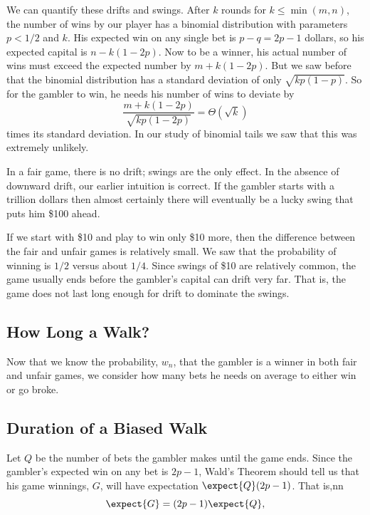 \begin{editingnotes}

We can quantify these drifts and swings.  After $k$ rounds for $k \le
\min(m,n)$, the number of wins by our player has a binomial distribution
with parameters $p < 1/2$ and $k$.  His expected win on any single bet is
$p-q = 2p-1$ dollars, so his expected capital is $n-k(1-2p)$.  Now to be a
winner, his actual number of wins must exceed the expected number by
$m+k(1-2p)$.  But we saw before that the binomial distribution has a
standard deviation of only $\sqrt{kp(1-p)}$.  So for the gambler to win,
he needs his number of wins to deviate by
\[
\frac{m+k(1-2p)}{\sqrt{kp(1-2p)}}=\Theta(\sqrt{k})
\]
times its standard deviation.  In our study of binomial tails we saw that
this was extremely unlikely.

In a fair game, there is no drift; swings are the only effect.  In the
absence of downward drift, our earlier intuition is correct.  If the
gambler starts with a trillion dollars then almost certainly there
will eventually be a lucky swing that puts him \$100 ahead.

If we start with \$10 and play to win only \$10 more, then the difference
between the fair and unfair games is relatively small. We saw that the
probability of winning is $1/2$ versus about $1/4$.  Since swings of \$10
are relatively common, the game usually ends before the gambler's capital
can drift very far.  That is, the game does not last long enough for drift
to dominate the swings.

\subsection{How Long a Walk?}

Now that we know the probability, $w_n$, that the gambler is a winner in
both fair and unfair games, we consider how many bets he needs on average
to either win or go broke.

\subsection{Duration of a Biased Walk}

Let $Q$ be the number of bets the gambler makes until the game ends.  Since
the gambler's expected win on any bet is $2p-1$, Wald's Theorem should tell
us that his game winnings, $G$, will have expectation $\expect{Q}(2p-1)$.
That is,nn
\begin{equation}\label{LN12:gw}
\expect{G} = (2p-1)\expect{Q},
\end{equation}


\end{editingnotes}
